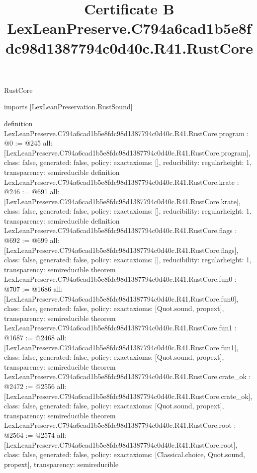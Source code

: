 \begin{lexlean}{RustCore}
\title{Certificate B LexLeanPreserve.C794a6cad1b5e8fdc98d1387794c0d40c.R41.RustCore}
\begin{coremodule}
imports [LexLeanPreservation.RustSound]

definition LexLeanPreserve.C794a6cad1b5e8fdc98d1387794c0d40c.R41.RustCore.program : @0 := @245 {
  all: [LexLeanPreserve.C794a6cad1b5e8fdc98d1387794c0d40c.R41.RustCore.program],
  class: false,
  generated: false,
  policy: exact{axioms: []},
  reducibility: regular{height: 1},
  transparency: semireducible
}
definition LexLeanPreserve.C794a6cad1b5e8fdc98d1387794c0d40c.R41.RustCore.krate : @246 := @691 {
  all: [LexLeanPreserve.C794a6cad1b5e8fdc98d1387794c0d40c.R41.RustCore.krate],
  class: false,
  generated: false,
  policy: exact{axioms: []},
  reducibility: regular{height: 1},
  transparency: semireducible
}
definition LexLeanPreserve.C794a6cad1b5e8fdc98d1387794c0d40c.R41.RustCore.flags : @692 := @699 {
  all: [LexLeanPreserve.C794a6cad1b5e8fdc98d1387794c0d40c.R41.RustCore.flags],
  class: false,
  generated: false,
  policy: exact{axioms: []},
  reducibility: regular{height: 1},
  transparency: semireducible
}
theorem LexLeanPreserve.C794a6cad1b5e8fdc98d1387794c0d40c.R41.RustCore.fun0 : @707 := @1686 {
  all: [LexLeanPreserve.C794a6cad1b5e8fdc98d1387794c0d40c.R41.RustCore.fun0],
  class: false,
  generated: false,
  policy: exact{axioms: [Quot.sound, propext]},
  transparency: semireducible
}
theorem LexLeanPreserve.C794a6cad1b5e8fdc98d1387794c0d40c.R41.RustCore.fun1 : @1687 := @2468 {
  all: [LexLeanPreserve.C794a6cad1b5e8fdc98d1387794c0d40c.R41.RustCore.fun1],
  class: false,
  generated: false,
  policy: exact{axioms: [Quot.sound, propext]},
  transparency: semireducible
}
theorem LexLeanPreserve.C794a6cad1b5e8fdc98d1387794c0d40c.R41.RustCore.crate_ok : @2472 := @2556 {
  all: [LexLeanPreserve.C794a6cad1b5e8fdc98d1387794c0d40c.R41.RustCore.crate_ok],
  class: false,
  generated: false,
  policy: exact{axioms: [Quot.sound, propext]},
  transparency: semireducible
}
theorem LexLeanPreserve.C794a6cad1b5e8fdc98d1387794c0d40c.R41.RustCore.root : @2564 := @2574 {
  all: [LexLeanPreserve.C794a6cad1b5e8fdc98d1387794c0d40c.R41.RustCore.root],
  class: false,
  generated: false,
  policy: exact{axioms: [Classical.choice, Quot.sound, propext]},
  transparency: semireducible
}


\end{coremodule}
\end{lexlean}
